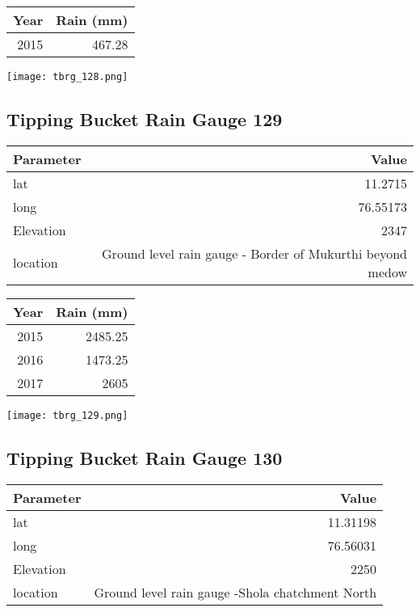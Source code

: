 \documentclass[a4paper]{article}
\begin{document}
\begin{center}
\begin{tabular}{rr}
Year & Rain (mm)\\
\hline
2015 & 467.28\\
\end{tabular}
\end{center}

\begin{center}
\texttt{[image: tbrg\_128.png]}
\end{center}

\newpage

\subsection*{Tipping Bucket Rain Gauge 129}
\label{sec:orgd1cfe80}


\begin{center}
\begin{tabular}{lr}
Parameter & Value\\
\hline
lat & 11.2715\\
long & 76.55173\\
Elevation & 2347\\
location & Ground level rain gauge - Border of Mukurthi beyond medow\\
\end{tabular}
\end{center}


\begin{center}
\begin{tabular}{rr}
Year & Rain (mm)\\
\hline
2015 & 2485.25\\
2016 & 1473.25\\
2017 & 2605\\
\end{tabular}
\end{center}

\begin{center}
\texttt{[image: tbrg\_129.png]}
\end{center}

\newpage

\subsection*{Tipping Bucket Rain Gauge 130}
\label{sec:org36e04fd}

\begin{center}
\begin{tabular}{lr}
Parameter & Value\\
\hline
lat & 11.31198\\
long & 76.56031\\
Elevation & 2250\\
location & Ground level rain gauge -Shola chatchment North\\
\end{tabular}
\end{center}
\end{document}
